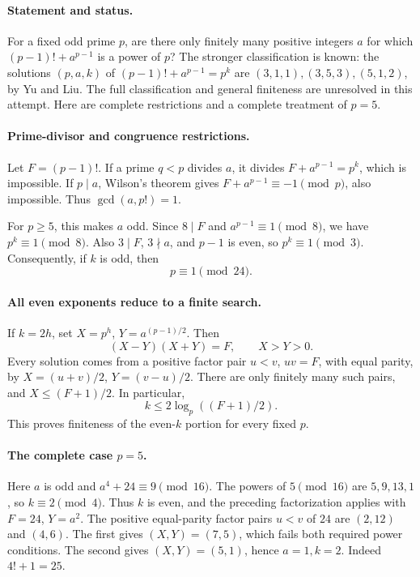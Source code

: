 \paragraph{Statement and status.}
For a fixed odd prime \(p\), are there only finitely many positive integers
\(a\) for which \((p-1)!+a^{p-1}\) is a power of \(p\)?
The stronger classification is known: the solutions \((p,a,k)\) of
\((p-1)!+a^{p-1}=p^k\) are
\((3,1,1),(3,5,3),(5,1,2)\), by Yu and Liu.
The full classification and general finiteness are unresolved in this
attempt. Here are complete restrictions and a complete treatment of \(p=5\).

\paragraph{Prime-divisor and congruence restrictions.}
Let \(F=(p-1)!\). If a prime \(q<p\) divides \(a\), it divides
\(F+a^{p-1}=p^k\), which is impossible. If \(p\mid a\), Wilson's theorem
gives \(F+a^{p-1}\equiv-1\pmod p\), also impossible. Thus
\(\gcd(a,p!)=1\).

For \(p\geq5\), this makes \(a\) odd. Since \(8\mid F\) and
\(a^{p-1}\equiv1\pmod8\), we have \(p^k\equiv1\pmod8\).
Also \(3\mid F\), \(3\nmid a\), and \(p-1\) is even, so
\(p^k\equiv1\pmod3\). Consequently, if \(k\) is odd, then
\[
 p\equiv1\pmod{24}.
 \tag{1}
\]

\paragraph{All even exponents reduce to a finite search.}
If \(k=2h\), set \(X=p^h\), \(Y=a^{(p-1)/2}\). Then
\[
 (X-Y)(X+Y)=F,\qquad X>Y>0.
\]
Every solution comes from a positive factor pair \(u<v\), \(uv=F\),
with equal parity, by \(X=(u+v)/2\), \(Y=(v-u)/2\).
There are only finitely many such pairs, and
\(X\leq(F+1)/2\). In particular,
\[
 k\leq2\log_p((F+1)/2).
\]
This proves finiteness of the even-\(k\) portion for every fixed \(p\).

\paragraph{The complete case \(p=5\).}
Here \(a\) is odd and \(a^4+24\equiv9\pmod{16}\).
The powers of \(5\pmod{16}\) are \(5,9,13,1\), so \(k\equiv2\pmod4\).
Thus \(k\) is even, and the preceding factorization applies with
\(F=24\), \(Y=a^2\). The positive equal-parity factor pairs \(u<v\)
of \(24\) are \((2,12)\) and \((4,6)\). The first gives
\((X,Y)=(7,5)\), which fails both required power conditions.
The second gives \((X,Y)=(5,1)\), hence \(a=1,k=2\).
Indeed \(4!+1=25\).

